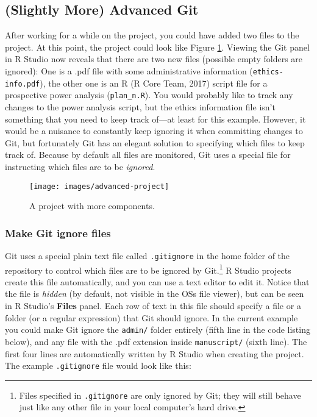 \documentclass[
  american,
  ,doc,floatsintext]{apa6}
\begin{document}
\hypertarget{slightly-more-advanced-git}{%
\subsection{(Slightly More) Advanced Git}\label{slightly-more-advanced-git}}

After working for a while on the project, you could have added two files to the project. At this point, the project could look like Figure \ref{fig:advanced-project}. Viewing the Git panel in R Studio now reveals that there are two new files (possible empty folders are ignored): One is a .pdf file with some administrative information (\texttt{ethics-info.pdf}), the other one is an R (R Core Team, 2017) script file for a prospective power analysis (\texttt{plan\_n.R}). You would probably like to track any changes to the power analysis script, but the ethics information file isn't something that you need to keep track of---at least for this example. However, it would be a nuisance to constantly keep ignoring it when committing changes to Git, but fortunately Git has an elegant solution to specifying which files to keep track of. Because by default all files are monitored, Git uses a special file for instructing which files are to be \emph{ignored}.

\begin{figure}

{\centering \texttt{[image: images/advanced-project]} 

}

\caption{A project with more components.}\label{fig:advanced-project}
\end{figure}

\hypertarget{make-git-ignore-files}{%
\subsubsection{Make Git ignore files}\label{make-git-ignore-files}}

Git uses a special plain text file called \texttt{.gitignore} in the home folder of the repository to control which files are to be ignored by Git.\footnote{Files specified in \texttt{.gitignore} are only ignored by Git; they will still behave just like any other file in your local computer's hard drive.} R Studio projects create this file automatically, and you can use a text editor to edit it. Notice that the file is \emph{hidden} (by default, not visible in the OSs file viewer), but can be seen in R Studio's \textbf{Files} panel. Each row of text in this file should specify a file or a folder (or a regular expression) that Git should ignore. In the current example you could make Git ignore the \texttt{admin/} folder entirely (fifth line in the code listing below), and any file with the .pdf extension inside \texttt{manuscript/} (sixth line). The first four lines are automatically written by R Studio when creating the project. The example \texttt{.gitignore} file would look like this:
\end{document}
